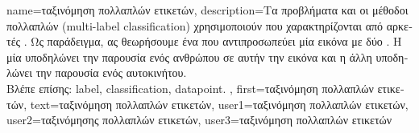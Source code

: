 {name={\foreignlanguage{greek}{ταξινόμηση πολλαπλών ετικετών}}, 
	description={\foreignlanguage{greek}{Τα προβλήματα και οι μέθοδοι}  \foreignlanguage{greek}{πολλαπλών} 
		 (multi-label classification) 
		\foreignlanguage{greek}{χρησιμοποιούν}  \foreignlanguage{greek}{που χαρακτηρίζονται από αρκετές}
		. \foreignlanguage{greek}{Ως παράδειγμα, ας θεωρήσουμε ένα}  \foreignlanguage{greek}{που 
		αντιπροσωπεύει μία εικόνα με δύο} . \foreignlanguage{greek}{Η μία}  \foreignlanguage{greek}{υποδηλώνει 
		την παρουσία ενός ανθρώπου σε αυτήν την εικόνα και η άλλη}  \foreignlanguage{greek}{υποδηλώνει την παρουσία 
		ενός αυτοκινήτου}.
				\\
		\foreignlanguage{greek}{Βλέπε επίσης:} \gls{label}, \gls{classification}, \gls{datapoint}. },
	first={\foreignlanguage{greek}{ταξινόμηση πολλαπλών ετικετών}},
	text={\foreignlanguage{greek}{ταξινόμηση πολλαπλών ετικετών}},
	user1={\foreignlanguage{greek}{ταξινόμηση πολλαπλών ετικετών}}, %
	user2={\foreignlanguage{greek}{ταξινόμησης πολλαπλών ετικετών}}, %
	user3={\foreignlanguage{greek}{ταξινόμηση πολλαπλών ετικετών}} %
}


